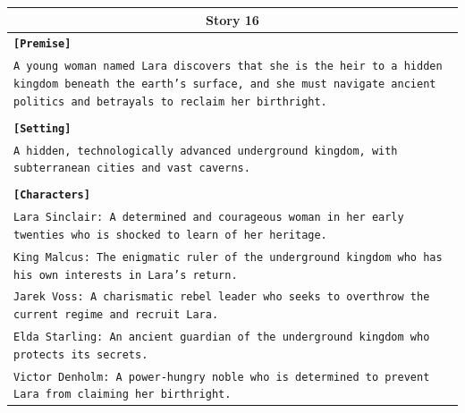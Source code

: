 \documentclass[letterpaper]{article} %
\begin{document}
\begin{small}
\begin{longtable}{p{\textwidth}}
    \multicolumn{1}{c}{\textbf{Story 16}} \\
    \midrule
    \texttt{\textbf{[Premise]}} \\
    \texttt{A young woman named Lara discovers that she is the heir to a hidden kingdom beneath the earth's surface, and she must navigate ancient politics and betrayals to reclaim her birthright.} \\\\
    \texttt{\textbf{[Setting]}} \\
    \texttt{A hidden, technologically advanced underground kingdom, with subterranean cities and vast caverns.} \\\\
    \texttt{\textbf{[Characters]}} \\
    \texttt{Lara Sinclair: A determined and courageous woman in her early twenties who is shocked to learn of her heritage.} \\
    \texttt{King Malcus: The enigmatic ruler of the underground kingdom who has his own interests in Lara's return.} \\
    \texttt{Jarek Voss: A charismatic rebel leader who seeks to overthrow the current regime and recruit Lara.} \\
    \texttt{Elda Starling: An ancient guardian of the underground kingdom who protects its secrets.} \\
    \texttt{Victor Denholm: A power-hungry noble who is determined to prevent Lara from claiming her birthright.} \\
    \midrule
  

\end{longtable}
\end{small}
\end{document}
